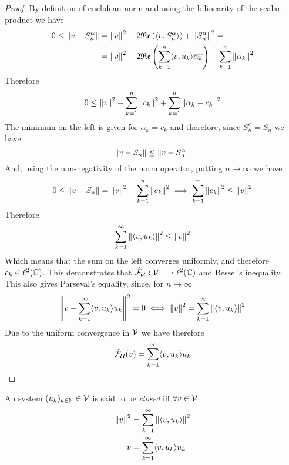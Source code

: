 \documentclass[../complete.tex]{subfiles}
\begin{document}
\begin{proof}
	By definition of euclidean norm and using the bilinearity of the scalar product we have
	\begin{equation*}
		\begin{aligned}
			0\le\norm{v-S_n^\alpha}&=\norm{v}^2-2\mathfrak{Re}\left( \langle v, S_n^\alpha \rangle \right)+\norm{S_n^\alpha}^2=\\
			&=\norm{v}^2-2\mathfrak{Re}\left( \sum_{k=1}^n\langle v, u_k \rangle\overline{\alpha_k} \right)+\sum_{k=1}^{n}\norm{\alpha_k}^2\\
		\end{aligned}
	\end{equation*}
	Therefore
	\begin{equation*}
		0\le\norm{v}^2-\sum_{k=1}^{n}\norm{c_k}^2+\sum_{k=1}^n\norm{\alpha_k-c_k}^2
	\end{equation*}
	The minimum on the left is given for $\alpha_k=c_k$ and therefore, since $S_n^c=S_n$ we have
	\begin{equation*}
		\norm{v-S_n}\le\norm{v-S_n^\alpha}
	\end{equation*}
	And, using the non-negativity of the norm operator, putting $n\to\infty$ we have
	\begin{equation*}
		0\le\norm{v-S_n}=\norm{v}^2-\sum_{k=1}^n\norm{c_k}^2\implies\sum_{k=1}^{n}\norm{c_k}^2\le\norm{v}^2
	\end{equation*}
	Therefore
	\begin{equation*}
		\sum_{k=1}^{\infty}\norm{\langle v, u_k \rangle}^2\le\norm{v}^2
	\end{equation*}
	Which means that the sum on the left converges uniformly, and therefore $c_k\in\ell^2(\mathbb{C})$. This demonstrates that $\hat{\mathcal{F}}_{\operatorname{\mathcal{U}}}:\mathcal{V}\overset{}{\longrightarrow}\ell^2(\mathbb{C})$ and Bessel's inequality.\\
	This also gives Parseval's equality, since, for $n\to\infty$
	\begin{equation*}
		\norm{v-\sum_{k=1}^{\infty}\langle v, u_k \rangle u_k}^2=0\iff\norm{v}^2=\sum_{k=1}^{\infty}\norm{\langle v, u_k \rangle}^2
	\end{equation*}
	Due to the uniform convergence in $\mathcal{V}$ we have therefore
	\begin{equation*}
		\hat{\mathcal{F}}_{\operatorname{\mathcal{U}}}(v)=\sum_{k=1}^\infty\langle v, u_k \rangle u_k
	\end{equation*}
\end{proof}
\begin{dfn}
	An system $(u_k)_{k\in\mathbb{N}}\in\mathcal{V}$ is said to be \textit{closed} iff $\forall v\in\mathcal{V}$
	\begin{equation*}
		\begin{aligned}
			\norm{v}^2&=\sum_{k=1}^{\infty}\norm{\langle v, u_k \rangle}^2\\
			v&=\sum_{k=1}^{\infty}\langle v, u_k \rangle u_k
		\end{aligned}
	\end{equation*}
\end{dfn}
\end{document}
